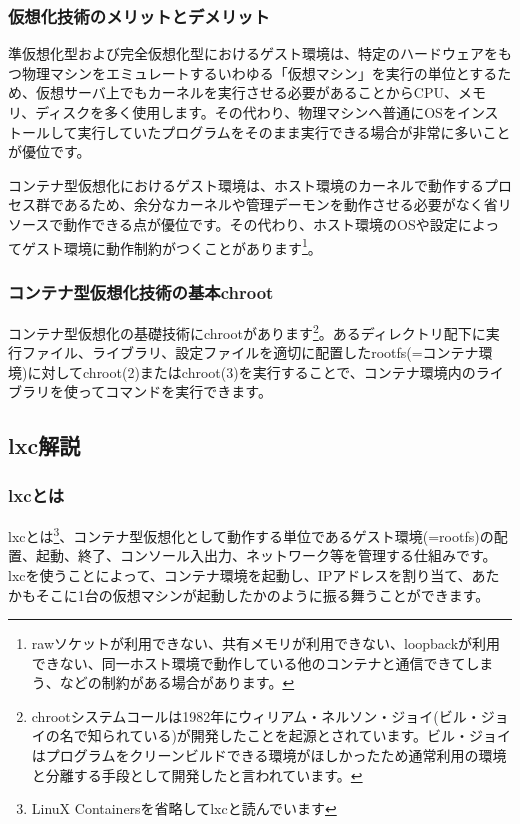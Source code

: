 \documentclass[mingoth,a4paper]{jsarticle}
\begin{document}
\subsubsection{仮想化技術のメリットとデメリット}

準仮想化型および完全仮想化型におけるゲスト環境は、特定のハードウェアをもつ物理マシンをエミュレートするいわゆる「仮想マシン」を実行の単位とするため、仮想サーバ上でもカーネルを実行させる必要があることからCPU、メモリ、ディスクを多く使用します。その代わり、物理マシンへ普通にOSをインストールして実行していたプログラムをそのまま実行できる場合が非常に多いことが優位です。

コンテナ型仮想化におけるゲスト環境は、ホスト環境のカーネルで動作するプロセス群であるため、余分なカーネルや管理デーモンを動作させる必要がなく省リソースで動作できる点が優位です。その代わり、ホスト環境のOSや設定によってゲスト環境に動作制約がつくことがあります\footnote{rawソケットが利用できない、共有メモリが利用できない、loopbackが利用できない、同一ホスト環境で動作している他のコンテナと通信できてしまう、などの制約がある場合があります。}。

\subsubsection{コンテナ型仮想化技術の基本chroot}

コンテナ型仮想化の基礎技術にchrootがあります\footnote{chrootシステムコールは1982年にウィリアム・ネルソン・ジョイ(ビル・ジョイの名で知られている)が開発したことを起源とされています。ビル・ジョイはプログラムをクリーンビルドできる環境がほしかったため通常利用の環境と分離する手段として開発したと言われています。}。あるディレクトリ配下に実行ファイル、ライブラリ、設定ファイルを適切に配置したrootfs(=コンテナ環境)に対してchroot(2)またはchroot(3)を実行することで、コンテナ環境内のライブラリを使ってコマンドを実行できます。

\subsection{lxc解説}
\subsubsection{lxcとは}

lxcとは\footnote{LinuX Containersを省略してlxcと読んでいます}、コンテナ型仮想化として動作する単位であるゲスト環境(=rootfs)の配置、起動、終了、コンソール入出力、ネットワーク等を管理する仕組みです。
lxcを使うことによって、コンテナ環境を起動し、IPアドレスを割り当て、あたかもそこに1台の仮想マシンが起動したかのように振る舞うことができます。
\end{document}
